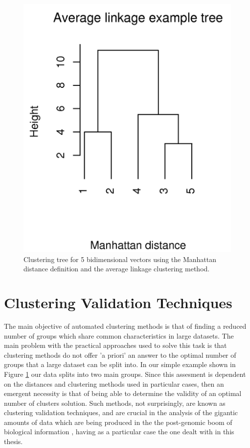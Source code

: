 \begin{figure}[t]
\centering
\includegraphics[scale=0.3]{Appendix/appendixtree.png}
\caption{Clustering  tree  for   5  bidimensional  vectors  using  the
  Manhattan  distance definition  and the  average  linkage clustering
  method.}
\label{fig:tree}
\end{figure}

\section{Clustering Validation Techniques}
\label{sec:validation}
The main objective of automated  clustering methods is that of finding
a reduced number of groups which share common characteristics in large
datasets. The main problem with the practical approaches used to solve
this task is that clustering methods do not offer 'a priori' an answer
to the  optimal number  of groups  that a large  dataset can  be split
into. In  our simple example  shown in Figure \ref{fig:tree}  our data
splits into two main groups.  Since this assesment is dependent on the
distances  and clustering methods  used in  particular cases,  then an
emergent necessity is that of  being able to determine the validity of
an   optimal  number   of  clusters   solution.   Such   methods,  not
surprisingly, are  known as clustering validation  techniques, and are
crucial  in the analysis  of the  gigantic amounts  of data  which are
being produced in the  the post-genomic boom of biological information
\cite{handl2005}, having  as a particular  case the one dealt  with in
this thesis.

